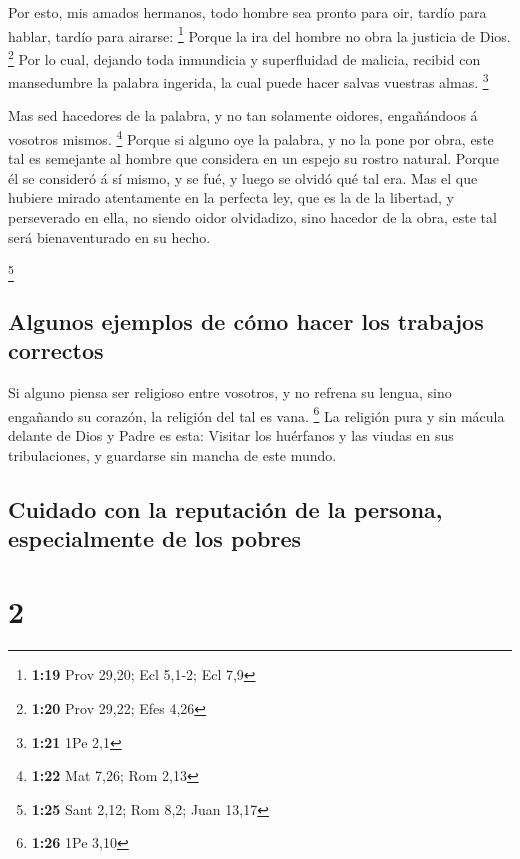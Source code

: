  Por esto, mis amados hermanos, todo hombre sea pronto para
oir, tardío para hablar, tardío para airarse: \footnote{\textbf{1:19}
  Prov 29,20; Ecl 5,1-2; Ecl 7,9}  Porque la ira del hombre
no obra la justicia de Dios. \footnote{\textbf{1:20} Prov 29,22; Efes
  4,26}  Por lo cual, dejando toda inmundicia y
superfluidad de malicia, recibid con mansedumbre la palabra ingerida, la
cual puede hacer salvas vuestras almas. \footnote{\textbf{1:21} 1Pe 2,1}

 Mas sed hacedores de la palabra, y no tan solamente
oidores, engañándoos á vosotros mismos. \footnote{\textbf{1:22} Mat
  7,26; Rom 2,13}  Porque si alguno oye la palabra, y no la
pone por obra, este tal es semejante al hombre que considera en un
espejo su rostro natural.  Porque él se consideró á sí
mismo, y se fué, y luego se olvidó qué tal era.  Mas el que
hubiere mirado atentamente en la perfecta ley, que es la de la libertad,
y perseverado en ella, no siendo oidor olvidadizo, sino hacedor de la
obra, este tal será bienaventurado en su hecho.

\footnote{\textbf{1:25} Sant 2,12; Rom 8,2; Juan 13,17}

\hypertarget{algunos-ejemplos-de-cuxf3mo-hacer-los-trabajos-correctos}{%
\subsection{Algunos ejemplos de cómo hacer los trabajos
correctos}\label{algunos-ejemplos-de-cuxf3mo-hacer-los-trabajos-correctos}}

 Si alguno piensa ser religioso entre vosotros, y no
refrena su lengua, sino engañando su corazón, la religión del tal es
vana. \footnote{\textbf{1:26} 1Pe 3,10}  La religión pura y
sin mácula delante de Dios y Padre es esta: Visitar los huérfanos y las
viudas en sus tribulaciones, y guardarse sin mancha de este mundo.

\hypertarget{cuidado-con-la-reputaciuxf3n-de-la-persona-especialmente-de-los-pobres}{%
\subsection{Cuidado con la reputación de la persona, especialmente de
los
pobres}\label{cuidado-con-la-reputaciuxf3n-de-la-persona-especialmente-de-los-pobres}}

\hypertarget{section-1}{%
\section{2}\label{section-1}}

